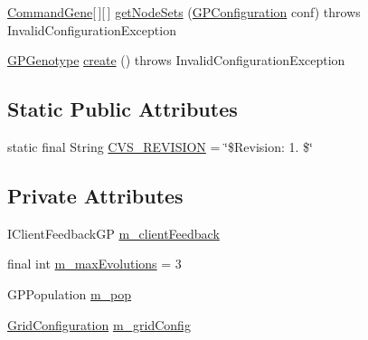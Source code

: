 \begin{DoxyCompactItemize}
\item 
\hyperlink{classorg_1_1jgap_1_1gp_1_1_command_gene}{Command\-Gene}\mbox{[}$\,$\mbox{]}\mbox{[}$\,$\mbox{]} \hyperlink{classexamples_1_1grid_1_1math_problem_distributed_1_1_client_evolve_strategy_a9b2fa5b55d1c7886bec5251f0c11710c}{get\-Node\-Sets} (\hyperlink{classorg_1_1jgap_1_1gp_1_1impl_1_1_g_p_configuration}{G\-P\-Configuration} conf)  throws Invalid\-Configuration\-Exception 
\item 
\hyperlink{classorg_1_1jgap_1_1gp_1_1impl_1_1_g_p_genotype}{G\-P\-Genotype} \hyperlink{classexamples_1_1grid_1_1math_problem_distributed_1_1_client_evolve_strategy_a2f74acd3f4568cae66d8ee7ca2ba0012}{create} ()  throws Invalid\-Configuration\-Exception 
\end{DoxyCompactItemize}
\subsection*{Static Public Attributes}
\begin{DoxyCompactItemize}
\item 
static final String \hyperlink{classexamples_1_1grid_1_1math_problem_distributed_1_1_client_evolve_strategy_aea23fd80f9fdb26be3ebb3bb3836b84f}{C\-V\-S\-\_\-\-R\-E\-V\-I\-S\-I\-O\-N} = \char`\"{}\$Revision\-: 1. \$\char`\"{}
\end{DoxyCompactItemize}
\subsection*{Private Attributes}
\begin{DoxyCompactItemize}
\item 
I\-Client\-Feedback\-G\-P \hyperlink{classexamples_1_1grid_1_1math_problem_distributed_1_1_client_evolve_strategy_ae48b9c70ed4cbd0fc93c7ac650ec0b8a}{m\-\_\-client\-Feedback}
\item 
final int \hyperlink{classexamples_1_1grid_1_1math_problem_distributed_1_1_client_evolve_strategy_ae9dde44546202496c6ec538cfe89665f}{m\-\_\-max\-Evolutions} = 3
\item 
G\-P\-Population \hyperlink{classexamples_1_1grid_1_1math_problem_distributed_1_1_client_evolve_strategy_afb7ebd90cdce7410e2d66a3b5fa512a4}{m\-\_\-pop}
\item 
\hyperlink{classexamples_1_1grid_1_1math_problem_distributed_1_1_grid_configuration}{Grid\-Configuration} \hyperlink{classexamples_1_1grid_1_1math_problem_distributed_1_1_client_evolve_strategy_a0577ef3c95315bf1e2afe9e74c775861}{m\-\_\-grid\-Config}
\end{DoxyCompactItemize}
